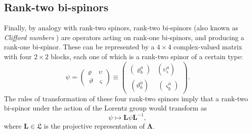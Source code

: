 \documentclass[11pt]{article}
\theoremstyle{definition}
\numberwithin{equation}{section}
\newcommand{\bL}{\mathbf{L}}
\newcommand{\beq}{\begin{equation}}
\newcommand{\eeq}{\end{equation}}
\newcommand{\fL}{\mathfrak{L}}
\newcommand{\bLa}{\boldsymbol{\Lambda}}
\begin{document}
\subsection{Rank-two bi-spinors}
\label{sec:defPWF}
 Finally, by analogy with rank-two spinors, rank-two bi-spinors (also known as {\em Clifford numbers} \cite{Rie1946}) are operators acting on rank-one bi-spinors, and producing a rank-one 
bi-spinor. 
 These can be represented by a $4\times 4$ complex-valued matrix with four $2\times 2$ blocks, each one of which is a rank-two spinor 
of a certain type:
\beq \label{rank2bisp}
\psi = \left( \begin{array}{cc} \varrho & \upsilon \\
\,\vartheta &\, \varsigma \end{array} \right)
\equiv \left( \begin{array}{cc} (\varrho^a_b) & (\upsilon^a_{^{\dot{b}}}) \\
\,(\vartheta^{\dot{a}}_b) &\, (\varsigma^{\dot{a}}_{\dot{b}} )\end{array} \right).
\eeq
 The rules of transformation of these four rank-two spinors imply that a rank-two bi-spinor under the action of the Lorentz group would 
transform as
\beq 
\psi \mapsto \bL \psi \bL^{-1},
\eeq
where $\bL \in \fL$ is the projective representation of $\bLa$.  

\end{document}
